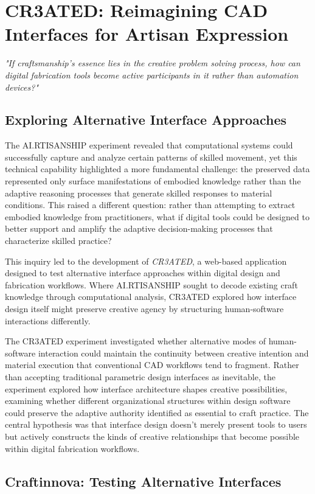 \section{CR3ATED: Reimagining CAD Interfaces for Artisan Expression}
\textit{"If craftsmanship's essence lies in the creative problem solving process, how can digital fabrication tools become active participants in it rather than automation devices?"}

\vspace{0.5cm}

\subsection{Exploring Alternative Interface Approaches}

The AI.RTISANSHIP experiment revealed that computational systems could successfully capture and analyze certain patterns of skilled movement, yet this technical capability highlighted a more fundamental challenge: the preserved data represented only surface manifestations of embodied knowledge rather than the adaptive reasoning processes that generate skilled responses to material conditions. This raised a different question: rather than attempting to extract embodied knowledge from practitioners, what if digital tools could be designed to better support and amplify the adaptive decision-making processes that characterize skilled practice?

\vspace{0.5cm}

This inquiry led to the development of \textit{CR3ATED}, a web-based application designed to test alternative interface approaches within digital design and fabrication workflows. Where AI.RTISANSHIP sought to decode existing craft knowledge through computational analysis, CR3ATED explored how interface design itself might preserve creative agency by structuring human-software interactions differently.

\vspace{0.5cm}

The CR3ATED experiment investigated whether alternative modes of human-software interaction could maintain the continuity between creative intention and material execution that conventional CAD workflows tend to fragment. Rather than accepting traditional parametric design interfaces as inevitable, the experiment explored how interface architecture shapes creative possibilities, examining whether different organizational structures within design software could preserve the adaptive authority identified as essential to craft practice. The central hypothesis was that interface design doesn't merely present tools to users but actively constructs the kinds of creative relationships that become possible within digital fabrication workflows.

\subsection{Craftinnova: Testing Alternative Interfaces}














